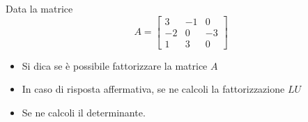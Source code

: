Data la matrice
\bigskip
\[
A=\left[
\begin{array}{ccc}
3 & -1 & 0 \\
-2 & 0 & -3\\
1 & 3 & 0
\end{array}\right]
\]

\begin{itemize}
\item Si dica se \`e possibile fattorizzare la matrice $A$
\item In caso di risposta affermativa, se ne calcoli la fattorizzazione $LU$
\item Se ne calcoli il determinante.
\end{itemize}
